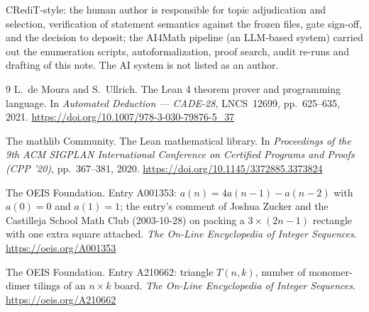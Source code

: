 \documentclass[11pt]{article}
\begin{document}
CRediT-style: the human author is responsible for topic adjudication and
selection, verification of statement semantics against the frozen files, gate
sign-off, and the decision to deposit; the AI4Math pipeline (an LLM-based system)
carried out the enumeration scripts, autoformalization, proof search, audit
re-runs and drafting of this note. The AI system is not listed as an author.

\begin{thebibliography}{9}
L.~de Moura and S.~Ullrich.
\newblock The Lean 4 theorem prover and programming language.
\newblock In \emph{Automated Deduction --- CADE-28}, LNCS~12699, pp.~625--635,
2021.
\newblock \url{https://doi.org/10.1007/978-3-030-79876-5_37}

{The mathlib Community}.
\newblock The Lean mathematical library.
\newblock In \emph{Proceedings of the 9th ACM SIGPLAN International Conference
on Certified Programs and Proofs (CPP '20)}, pp.~367--381, 2020.
\newblock \url{https://doi.org/10.1145/3372885.3373824}

{The OEIS Foundation}.
\newblock Entry A001353: $a(n) = 4a(n-1) - a(n-2)$ with $a(0)=0$ and $a(1)=1$;
the entry's comment of Joshua Zucker and the Castilleja School Math Club
(2003-10-28) on packing a $3 \times (2n-1)$ rectangle with one extra square
attached.
\newblock \emph{The On-Line Encyclopedia of Integer Sequences}.
\newblock \url{https://oeis.org/A001353}

{The OEIS Foundation}.
\newblock Entry A210662: triangle $T(n,k)$, number of monomer-dimer tilings of
an $n \times k$ board.
\newblock \emph{The On-Line Encyclopedia of Integer Sequences}.
\newblock \url{https://oeis.org/A210662}
\end{thebibliography}
\end{document}
